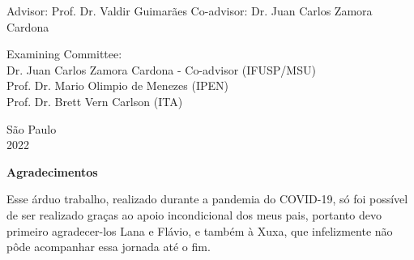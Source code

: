 \documentclass[a4paper,12pt,oneside]{book}
\begin{document}
\leftskip 6cm
\begin{flushright}	
\leftskip 6cm
Advisor: Prof. Dr.  Valdir Guimarães\hfill{ \hskip 5cm  } 
\leftskip 6cm
\newline
Co-advisor: Dr. Juan Carlos Zamora Cardona\hfill{ \hskip 4cm  }
\end{flushright}	

\vspace{0.6cm}    


\par
\leftskip 6cm
\par
\leftskip 0cm
\vskip 2cm


\noindent Examining Committee: \\
\noindent Dr. Juan Carlos Zamora Cardona - Co-advisor (IFUSP/MSU) \\
Prof. Dr. Mario Olimpio de Menezes (IPEN) \\
Prof. Dr. Brett Vern Carlson (ITA) \\
\vspace{1.8cm}


\begin{center}
    {S\~ao Paulo \\  2022}
\end{center}%

\clearpage
\thispagestyle{empty}
\begin{center}
\textbf{Agradecimentos}
\end{center}

\par Esse árduo trabalho, realizado durante a pandemia do COVID-19, só foi possível de ser realizado graças ao apoio incondicional dos meus pais, portanto devo primeiro agradecer-los Lana e Flávio, e também à Xuxa, que infelizmente não pôde acompanhar essa jornada até o fim.
\end{document}
